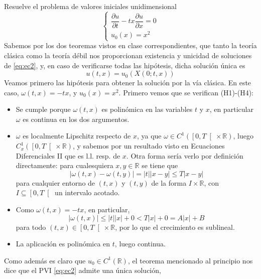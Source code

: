 \documentclass[12pt]{article}
\newcommand{\R}{\mathbb{R}}
\begin{document}
    \begin{ejercicio}
        Resuelve el problema de valores iniciales unidimensional 
        \begin{equation}\label{eq:ec2}
            \begin{cases}
                \dfrac{\partial u}{\partial t} - tx \dfrac{\partial u}{\partial x} = 0 \\
                u_0(x) = x^2
            \end{cases}
        \end{equation}
        Sabemos por los dos teoremas vistos en clase correspondientes, que tanto la teoría clásica como la teoría débil nos proporcionan existencia y unicidad de soluciones de \eqref{eq:ec2}, y, en caso de verificarse todas las hipótesis, dicha solución única es
        $$u(t,x) = u_0(X(0;t,x))$$
        Veamos primero las hipótesis para obtener la solución por la vía clásica. En este caso, $\omega(t,x) = -tx$, y $u_0(x) = x^2$. Primero vemos que se verifican (H1)-(H4):
        \begin{itemize}
            \item[(H1)] Se cumple porque $\omega(t,x)$ es polinómica en las variables $t$ y $x$, en particular $\omega$ es continua en los dos argumentos.
            \item[(H2)] $\omega$ es localmente Lipschitz respecto de $x$, ya que $\omega \in C^1(\left[0,T \right[ \times \R)$, luego $C^1_x(\left[0,T \right[ \times \R)$, y sabemos por un resultado visto en Ecuaciones Diferenciales II que es l.l. resp. de $x$.
            Otra forma sería verlo por definición directamente: para cualesquiera $x,y \in \R$ se tiene que
            $$|\omega(t,x) - \omega(t,y)| = |t||x-y| \leq T|x-y|$$
            para cualquier entorno de $(t,x)$ y $(t,y)$ de la forma $I \times \R$, con $I \subseteq \left[0,T \right[$ un intervalo acotado. 
            \item[(H3)] Como $\omega(t,x) = -tx$, en particular, $$|\omega(t,x)| \leq |t||x| + 0 < T|x| + 0 = A|x| + B$$
            para todo $(t,x) \in \left[0, T \right[ \times \R$, por lo que el crecimiento es sublineal.
            \item[(H4)] La aplicación \Func{\dfrac{\partial \omega}{\partial x}}{\left[0, T \right[ \times \R}{\R}{(t,x)}{\dfrac{\partial \omega}{\partial x}(t,x) = -t} es polinómica en $t$, luego continua.
        \end{itemize}
        Como además es claro que $u_0 \in C^1(\R)$, el teorema mencionado al principio nos dice que el PVI \eqref{eq:ec2} admite una única solución, 

\end{ejercicio}
\end{document}
